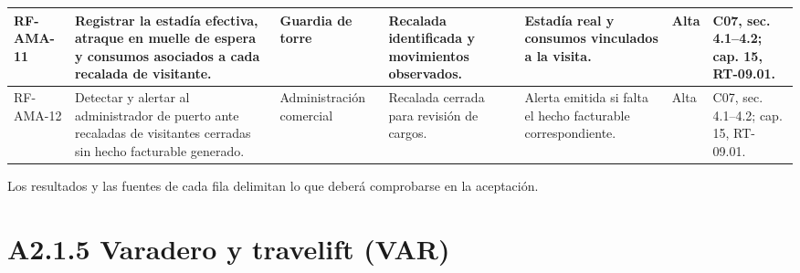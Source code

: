 \begin{longtable}{|L{0.080645\AnchoTablaAnexo}|L{0.262097\AnchoTablaAnexo}|L{0.100806\AnchoTablaAnexo}|L{0.145161\AnchoTablaAnexo}|L{0.173387\AnchoTablaAnexo}|L{0.060484\AnchoTablaAnexo}|L{0.177420\AnchoTablaAnexo}|}
RF-\allowbreak{}AMA-\allowbreak{}11 &
Registrar la estadía efectiva, atraque en muelle de espera y consumos asociados a cada recalada de visitante. &
Guardia de torre &
Recalada identificada y movimientos observados. &
Estadía real y consumos vinculados a la visita. &
Alta &
C07, sec. 4.1–4.2; cap. 15, RT-09.01. \\ \hline

RF-\allowbreak{}AMA-\allowbreak{}12 &
Detectar y alertar al administrador de puerto ante recaladas de visitantes cerradas sin hecho facturable generado. &
Administración comercial &
Recalada cerrada para revisión de cargos. &
Alerta emitida si falta el hecho facturable correspondiente. &
Alta &
C07, sec. 4.1–4.2; cap. 15, RT-09.01. \\ \hline

\end{longtable}

Los resultados y las fuentes de cada fila delimitan lo que deberá comprobarse en la aceptación.

\clearpage\section*{A2.1.5 Varadero y travelift (VAR)}


